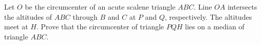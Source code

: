 Let $O$ be the circumcenter of an acute scalene triangle $ABC$. Line $OA$ intersects the altitudes of $ABC$ through $B$ and $C$ at $P$ and $Q$, respectively. The altitudes meet at $H$. Prove that the circumcenter of triangle $PQH$ lies on a median of triangle $ABC$.
